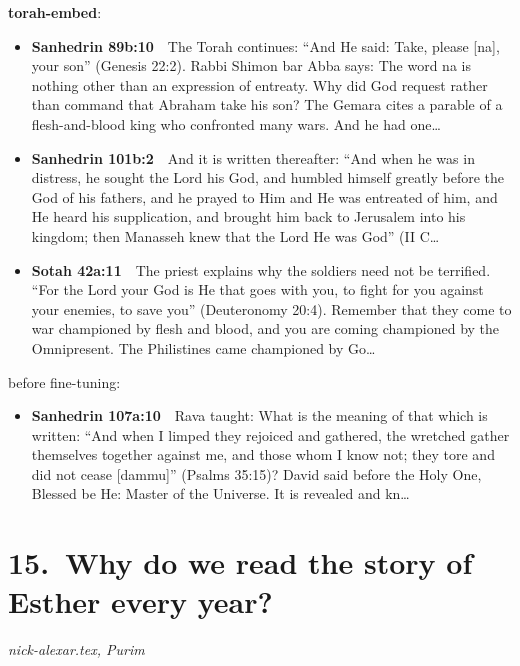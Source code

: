 \documentclass[11pt,a4paper]{article}
\begin{document}
{\color{quiet}\small\textbf{torah-embed}:}
\begin{itemize}[leftmargin=1.2em,itemsep=3pt]
\item {\color{ref}\textbf{Sanhedrin 89b:10}}\ \ The Torah continues: “And He said: Take, please [na], your son” (Genesis 22:2). Rabbi Shimon bar Abba says: The word na is nothing other than an expression of entreaty. Why did God request rather than command that Abraham take his son? The Gemara cites a parable of a flesh-and-blood king who confronted many wars. And he had one\ldots
\item {\color{ref}\textbf{Sanhedrin 101b:2}}\ \ And it is written thereafter: “And when he was in distress, he sought the Lord his God, and humbled himself greatly before the God of his fathers, and he prayed to Him and He was entreated of him, and He heard his supplication, and brought him back to Jerusalem into his kingdom; then Manasseh knew that the Lord He was God” (II C\ldots
\item {\color{ref}\textbf{Sotah 42a:11}}\ \ The priest explains why the soldiers need not be terrified. “For the Lord your God is He that goes with you, to fight for you against your enemies, to save you” (Deuteronomy 20:4). Remember that they come to war championed by flesh and blood, and you are coming championed by the Omnipresent. The Philistines came championed by Go\ldots
\end{itemize}
{\color{quiet}\small before fine-tuning:}
\begin{itemize}[leftmargin=1.2em]
\item {\color{ref}\textbf{Sanhedrin 107a:10}}\ \ Rava taught: What is the meaning of that which is written: “And when I limped they rejoiced and gathered, the wretched gather themselves together against me, and those whom I know not; they tore and did not cease [dammu]” (Psalms 35:15)? David said before the Holy One, Blessed be He: Master of the Universe. It is revealed and kn\ldots
\end{itemize}

\section*{15.\ Why do we read the story of Esther every year?}
{\color{quiet}\small\textit{nick-alexar.tex, Purim}}
\end{document}
